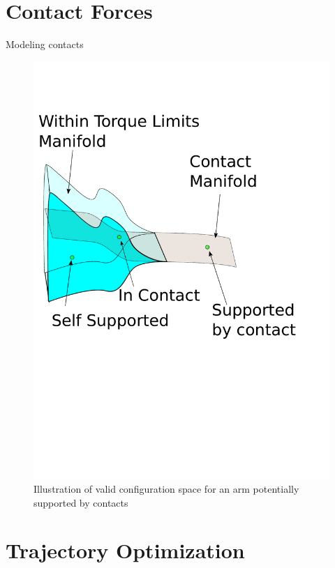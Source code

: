 \documentclass[../thesis.tex]{subfiles}
\begin{document}
\section{Contact Forces}
Modeling contacts
\begin{figure}
  \centering
  \includegraphics[width=.5\linewidth]{./Planning/thin_manifold.pdf}
  
  \caption{Illustration of valid configuration space for an arm potentially supported by contacts}
  \label{fig:ThinManifold}
\end{figure}





\section{Trajectory Optimization}
\end{document}
